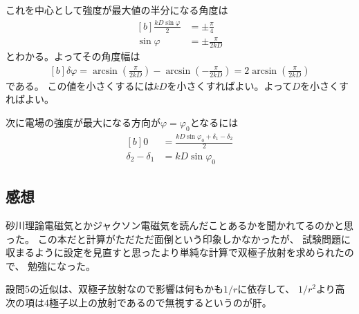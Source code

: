 \documentclass[../../sp_2017.tex]{subfiles}
\begin{document}
これを中心として強度が最大値の半分になる角度は
\begin{equation}\begin{aligned}[b]
    \frac{kD\sin\varphi}{2} &=  \pm\frac{\pi}{4}\\
    \sin\varphi &= \pm \frac{\pi}{2kD}
\end{aligned}\end{equation}
とわかる。よってその角度幅は
\begin{equation}\begin{aligned}[b]
    \delta\varphi = \arcsin(\frac{\pi}{2kD})-\arcsin(-\frac{\pi}{2kD}) = 2\arcsin(\frac{\pi}{2kD})
\end{aligned}\end{equation}
である。
この値を小さくするには\(kD\)を小さくすればよい。よって\(D\)を小さくすればよい。

次に電場の強度が最大になる方向が\(\varphi=\varphi_0\)となるには
\begin{equation}\begin{aligned}[b]
    0 &= \frac{kD\sin\varphi_0+\delta_1-\delta_2}{2}\\
    \delta_2-\delta_1 &= kD\sin\varphi_0
\end{aligned}\end{equation}

\subsection*{感想}
砂川理論電磁気とかジャクソン電磁気を読んだことあるかを聞かれてるのかと思った。
この本だと計算がただただ面倒という印象しかなかったが、
試験問題に収まるように設定を見直すと思ったより単純な計算で双極子放射を求められたので、
勉強になった。

設問5の近似は、双極子放射なので影響は何もかも\(1/r\)に依存して、
\(1/r^2\)より高次の項は4極子以上の放射であるので無視するというのが肝。
\end{document}
